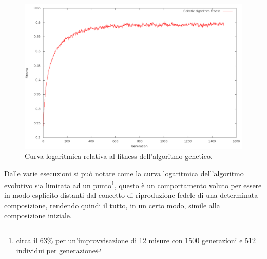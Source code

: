 \begin{figure}[H]
\centering
\includegraphics[width=\textwidth]{img/logcurve.png}
\caption{Curva logaritmica relativa al fitness dell'algoritmo genetico.}
\end{figure}
Dalle varie esecuzioni si può notare come la curva logaritmica dell'algoritmo
evolutivo sia limitata ad un punto\footnote{circa il 63\% per un'improvvisazione
di 12 misure con 1500 generazioni e 512 individui per generazione},
questo è un comportamento voluto
per essere in modo esplicito distanti dal concetto di riproduzione fedele di una
determinata composizione, rendendo quindi il tutto, in un certo modo,
simile alla composizione iniziale.

